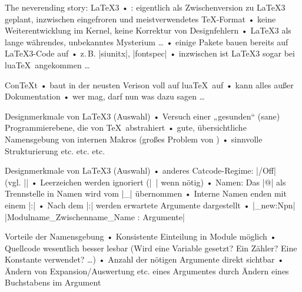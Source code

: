 \documentclass[t]{beamer}
\begin{document}
\begin{frame}{The neverending story: \LaTeX3}   %
• \LaTeXe: eigentlich als Zwischenversion zu \LaTeX3 geplant, inzwischen eingefroren und meistverwendetes \TeX-Format
• keine Weiterentwicklung im Kernel, keine Korrektur von Designfehlern
• \LaTeX3 als lange währendes, unbekanntes Mysterium …
• einige Pakete bauen bereits auf \LaTeX3-Code auf
• z.\,B. |siunitx|, |fontspec|
• inzwischen ist \LaTeX3 sogar bei lua\TeX\ angekommen …
\•
\end{frame}

\begin{frame}{Con\TeX t}
• baut in der neusten Verison voll auf lua\TeX\ auf
• kann alles außer Dokumentation
• wer mag, darf nun was dazu sagen …
\•
\end{frame}

\begin{frame}{Designmerkmale von \LaTeX3 (Auswahl)}
• Versuch einer „gesunden“ (sane) Programmierebene, die von \TeX\ abstrahiert
• gute, übersichtliche Namensgebung von internen Makros (großes Problem von \LaTeXe)
• sinnvolle Strukturierung etc. etc. etc.
\•
\end{frame}

\begin{frame}[fragile]{Designmerkmale von \LaTeX3 (Auswahl)}
• anderes Catcode-Regime: |\ExplSyntaxOn/Off|\\%
 (vgl. |\makeatletter \makeatother|
• Leerzeichen werden ignoriert (|~| wenn nötig)
• Namen: Das |@| als Trennstelle in Namen wird vom |_| übernommen
• Interne Namen enden mit einem |:|\pause
• Nach dem |:| werden erwartete Argumente dargestellt
• |\cs_new:Npn|\\%
|Modulname_Zwischenname_Name : Argumente|
\•
\end{frame}


\begin{frame}{Vorteile der Namensgebung}
• Konsistente Einteilung in Module möglich
• Quellcode wesentlich besser lesbar (Wird eine Variable gesetzt? Ein Zähler? Eine Konstante verwendet? …)
• Anzahl der nötigen Argumente direkt sichtbar
• Ändern von Expansion/Auswertung etc. eines Argumentes durch Ändern eines Buchstabens im Argument
\•
\end{frame}
\end{document}
